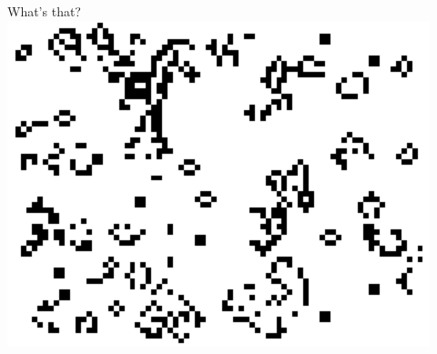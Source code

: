 \begin{frame}
    \titlepage
\end{frame}

\begin{frame}{What's that?}
    \centering
    \includegraphics[width=0.6\linewidth]{../paper/figures/game_of_life_still}
\end{frame}

